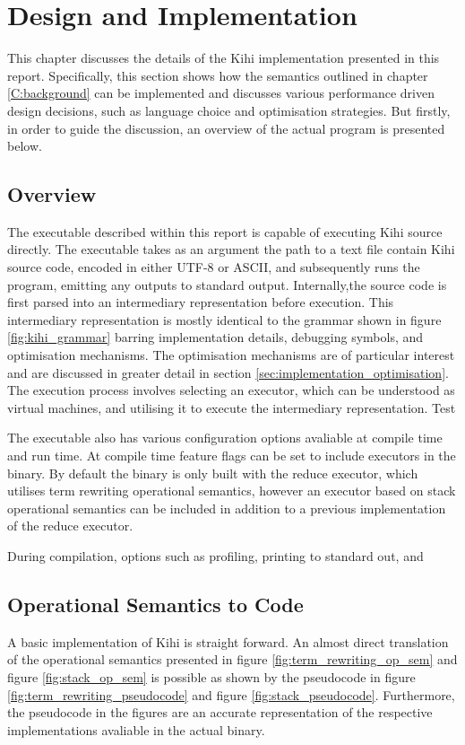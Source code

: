 \chapter{Design and Implementation} \label{C:implementation} 
This chapter discusses the details of the Kihi implementation presented in this report. Specifically, this section shows how the semantics outlined in chapter \ref{C:background} can be implemented and discusses various performance driven design decisions, such as language choice and optimisation strategies. But firstly, in order to guide the discussion, an overview of the actual program is presented below.

\section{Overview}
The executable described within this report is capable of executing Kihi source directly. The executable takes as an argument the path to a text file contain Kihi source code, encoded in either UTF-8 or ASCII, and subsequently runs the program, emitting any outputs to standard output. Internally,the source code is first parsed into an intermediary representation before execution. This     intermediary representation is mostly identical to the grammar shown in figure \ref{fig:kihi_grammar} barring implementation details, debugging symbols, and optimisation mechanisms. The optimisation mechanisms are of particular interest and are discussed in greater detail in section \ref{sec:implementation_optimisation}. The execution process involves selecting an executor, which can be understood as virtual machines, and utilising it to execute the intermediary representation. Test

The executable also has various configuration options avaliable at compile time and run time. At compile time feature flags can be set to include executors in the binary. By default the binary is only built with the reduce executor, which utilises term rewriting operational semantics, however an executor based on stack operational semantics can be included in addition to a previous implementation of the reduce executor.

During compilation, options such as profiling, printing to standard out, and 

\section{Operational Semantics to Code}
A basic implementation of Kihi is straight forward. An almost direct translation of the operational semantics presented in figure \ref{fig:term_rewriting_op_sem} and figure \ref{fig:stack_op_sem} is possible as shown by the pseudocode in figure \ref{fig:term_rewriting_pseudocode} and figure \ref{fig:stack_pseudocode}. Furthermore, the pseudocode in the figures are an accurate representation of the respective implementations avaliable in the actual binary.



